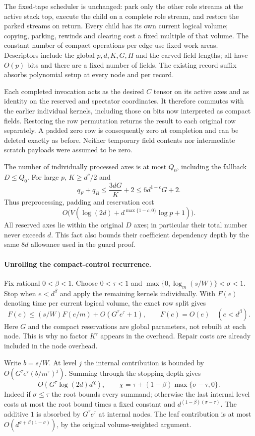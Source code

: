 The fixed-tape scheduler is unchanged: park only the other role streams at
the active stack top, execute the child on a complete role stream, and restore
the parked streams on return. Every child has its own current logical volume;
copying, parking, rewinds and clearing cost a fixed multiple of that volume.
The constant number of compact operations per edge use fixed work areas.
Descriptors include the global $p,d,K,G,H$ and the carved field lengths;
all have $O(p)$ bits and there are a fixed number of fields. The existing
record suffix absorbs polynomial setup at every node and per record.

Each completed invocation acts as the desired $C$ tensor on its active axes
and as identity on the reserved and spectator coordinates. It therefore
commutes with the earlier individual kernels, including those on bits now
interpreted as compact fields. Restoring the row permutation returns the
result to each original row separately. A padded zero row is consequently
zero at completion and can be deleted exactly as before. Neither temporary
field contents nor intermediate scratch payloads were assumed to be zero.

The number of individually processed axes is at most $Q_0$, including the
fallback $D\le Q_0$. For large $p$, $K\ge d^c/2$ and
\[
 q_F+q_B\le\frac{3dG}{K}+2\le6d^{1-c}G+2.
\]
Thus preprocessing, padding and reservation cost
\[
 O\bigl(V(\log(2d)+d^{\max\{1-c,0\}}\log p+1)\bigr).
\]
All reserved axes lie within the original $D$ axes; in particular their
total number never exceeds $d$. This fact also bounds their coefficient
dependency depth by the same $8d$ allowance used in the guard proof.

\paragraph{Unrolling the compact-control recurrence.}
Fix rational $0<\beta<1$. Choose $0<\tau<1$ and
$\max\{0,\log_m(s/W)\}<\sigma<1$. Stop when $e<d^\beta$ and apply
the remaining kernels individually. With $F(e)$ denoting time per current
logical volume, the exact row split gives
\[
 F(e)\le(s/W)F(e/m)+O(G^\tau e^\tau+1),\qquad
 F(e)=O(e)\quad(e<d^\beta).
\]
Here $G$ and the compact reservations are global parameters, not rebuilt
at each node. This is why no factor $K^\tau$ appears in the overhead.
Repair costs are already included in the node overhead.

Write $b=s/W$. At level $j$ the internal contribution is bounded by
$O(G^\tau e^\tau(b/m^\tau)^j)$. Summing through the stopping depth gives
\[
 O(G^\tau\log(2d)d^\chi),\qquad
 \chi=\tau+(1-\beta)\max\{\sigma-\tau,0\}.
\]
Indeed if $\sigma\le\tau$ the root bounds every summand; otherwise the
last internal level costs at most the root bound times a fixed constant
and $d^{(1-\beta)(\sigma-\tau)}$. The additive $1$ is absorbed by
$G^\tau e^\tau$ at internal nodes. The leaf contribution is at most
$O(d^{\sigma+\beta(1-\sigma)})$, by the original volume-weighted argument.

